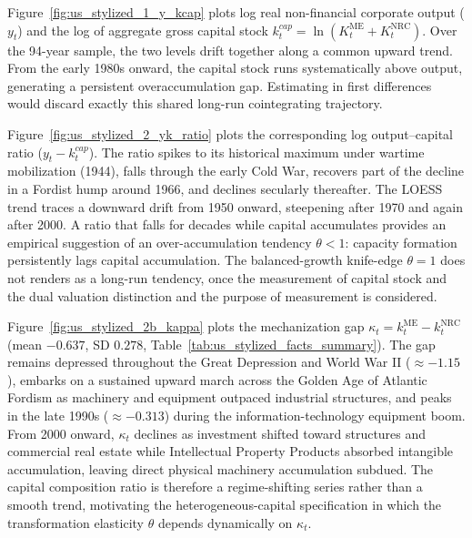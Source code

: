 

Figure~\ref{fig:us_stylized_1_y_kcap} plots log real non-financial corporate output ($y_t$) and the log of aggregate gross capital stock $k_t^{cap} = \ln(K_t^{\text{ME}} + K_t^{\text{NRC}})$. Over the 94-year sample, the two levels drift together along a common upward trend. From the early 1980s onward, the capital stock runs systematically above output, generating a persistent overaccumulation gap. Estimating in first differences would discard exactly this shared long-run cointegrating trajectory.

Figure~\ref{fig:us_stylized_2_yk_ratio} plots the corresponding log output--capital ratio ($y_t - k_t^{cap}$). The ratio spikes to its historical maximum under wartime mobilization (1944), falls through the early Cold War, recovers part of the decline in a Fordist hump around 1966, and declines secularly thereafter. The LOESS trend traces a downward drift from 1950 onward, steepening after 1970 and again after 2000. A ratio that falls for decades while capital accumulates provides an empirical suggestion of an over-accumulation tendency $\theta < 1$: capacity formation persistently lags capital accumulation. The balanced-growth knife-edge $\theta = 1$ does not renders as a long-run tendency, once the measurement of capital stock and the dual valuation distinction and the purpose of measurement is considered. 

Figure~\ref{fig:us_stylized_2b_kappa} plots the mechanization gap $\kappa_t = k_t^{\text{ME}} - k_t^{\text{NRC}}$ (mean $-0.637$, SD $0.278$, Table~\ref{tab:us_stylized_facts_summary}). The gap remains depressed throughout the Great Depression and World War II ($\approx -1.15$), embarks on a sustained upward march across the Golden Age of Atlantic Fordism as machinery and equipment outpaced industrial structures, and peaks in the late 1990s ($\approx -0.313$) during the information-technology equipment boom. From 2000 onward, $\kappa_t$ declines as investment shifted toward structures and commercial real estate while Intellectual Property Products absorbed intangible accumulation, leaving direct physical machinery accumulation subdued. The capital composition ratio is therefore a regime-shifting series rather than a smooth trend, motivating the heterogeneous-capital specification in which the transformation elasticity $\theta$ depends dynamically on $\kappa_t$.

